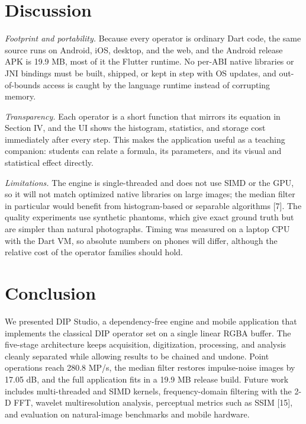 \documentclass[journal]{IEEEtran}
\begin{document}
\section{Discussion}
\label{sec:disc}
\textit{Footprint and portability.} Because every operator is ordinary Dart code, the same source runs on Android, iOS, desktop, and the web, and the Android release APK is 19.9 MB, most of it the Flutter runtime. No per-ABI native libraries or JNI bindings must be built, shipped, or kept in step with OS updates, and out-of-bounds access is caught by the language runtime instead of corrupting memory.

\textit{Transparency.} Each operator is a short function that mirrors its equation in Section IV, and the UI shows the histogram, statistics, and storage cost immediately after every step. This makes the application useful as a teaching companion: students can relate a formula, its parameters, and its visual and statistical effect directly.

\textit{Limitations.} The engine is single-threaded and does not use SIMD or the GPU, so it will not match optimized native libraries on large images; the median filter in particular would benefit from histogram-based or separable algorithms [7]. The quality experiments use synthetic phantoms, which give exact ground truth but are simpler than natural photographs. Timing was measured on a laptop CPU with the Dart VM, so absolute numbers on phones will differ, although the relative cost of the operator families should hold.

\section{Conclusion}
\label{sec:concl}
We presented DIP Studio, a dependency-free engine and mobile application that implements the classical DIP operator set on a single linear RGBA buffer. The five-stage architecture keeps acquisition, digitization, processing, and analysis cleanly separated while allowing results to be chained and undone. Point operations reach 280.8 MP/s, the median filter restores impulse-noise images by 17.05 dB, and the full application fits in a 19.9 MB release build. Future work includes multi-threaded and SIMD kernels, frequency-domain filtering with the 2-D FFT, wavelet multiresolution analysis, perceptual metrics such as SSIM [15], and evaluation on natural-image benchmarks and mobile hardware.
\end{document}
